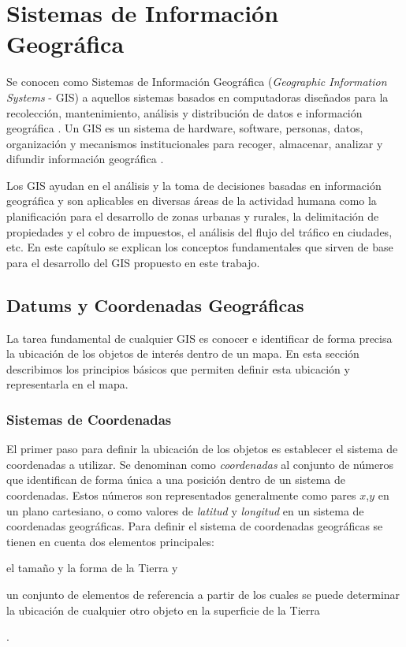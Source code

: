 \chapter{Sistemas de Información Geográfica}
\label{cap:2}

Se conocen como Sistemas de Información Geográfica (\emph{Geographic Information Systems} - GIS) a aquellos sistemas basados en computadoras diseñados para la recolección, mantenimiento, análisis y distribución de datos e información geográfica \citep{bolstad2005gis}. Un GIS es un sistema de hardware, software, personas, datos, organización y mecanismos institucionales para recoger, almacenar, analizar y difundir información geográfica \citep{dueker1989multipurpose}.

Los GIS ayudan en el análisis y la toma de decisiones basadas en información geográfica y son aplicables en diversas áreas de la actividad humana como la planificación para el desarrollo de zonas urbanas y rurales, la delimitación de propiedades y el cobro de  impuestos, el análisis del flujo del tráfico en ciudades, etc. En este capítulo se explican los conceptos fundamentales que sirven de base para el desarrollo del GIS propuesto en este trabajo.

\section{Datums y Coordenadas Geográficas}

La tarea fundamental de cualquier GIS es conocer e identificar de forma precisa la ubicación de los objetos de interés dentro de un mapa. En esta sección describimos los principios básicos que permiten definir esta ubicación y representarla en el mapa.

\subsection{Sistemas de Coordenadas}
\label{sistema_de_coordenadas}

El primer paso para definir la ubicación de los objetos es establecer el sistema de coordenadas a utilizar. Se denominan como \emph{coordenadas} al conjunto de números que identifican de forma única a una posición dentro de un sistema de coordenadas. Estos números son representados generalmente como pares $x$,$y$ en un plano cartesiano, o como valores de \emph{latitud} y \emph{longitud} en un sistema de coordenadas geográficas. Para definir el sistema de coordenadas geográficas se tienen en cuenta dos elementos principales: \begin{enumerate*}[1)] \item el tamaño y la forma de la Tierra y \item un conjunto de elementos de referencia a partir de los cuales se puede determinar la ubicación de cualquier otro objeto en la superficie de la Tierra\end{enumerate*}.

